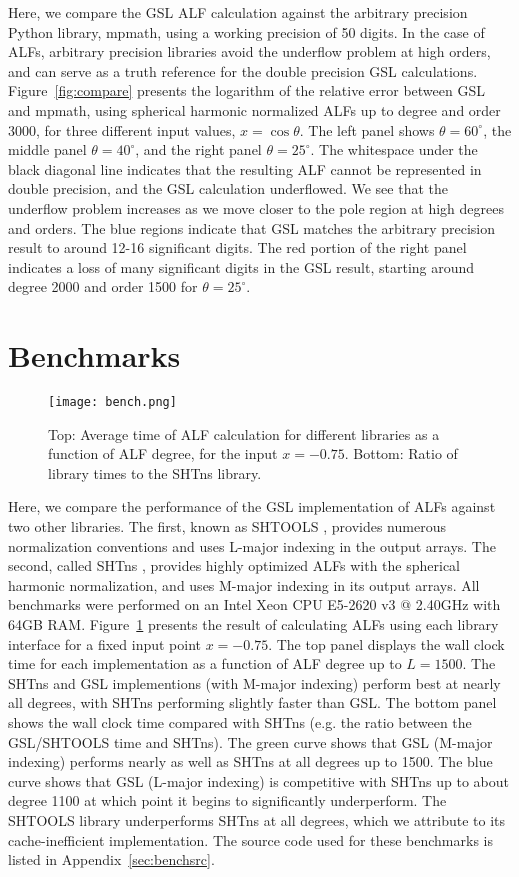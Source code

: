 \documentclass[12pt]{article}
\begin{document}
Here, we compare the GSL ALF calculation against the
arbitrary precision Python library, mpmath, using a working
precision of 50 digits. In the case of ALFs, arbitrary precision
libraries avoid the underflow problem at high orders, and can
serve as a truth reference for the double precision GSL calculations.
Figure~\ref{fig:compare} presents the logarithm of the relative error
between GSL and mpmath, using spherical harmonic normalized ALFs up to
degree and order 3000, for three different input values, $x = \cos{\theta}$.
The left panel shows $\theta = 60^{\circ}$, the middle panel
$\theta = 40^{\circ}$, and the right panel $\theta = 25^{\circ}$. The
whitespace under the black diagonal line indicates that the resulting
ALF cannot be represented in double precision, and the GSL calculation
underflowed. We see that the underflow problem increases as we move
closer to the pole region at high degrees and orders. The blue regions
indicate that GSL matches the arbitrary precision result to around 12-16
significant digits. The red portion of the right panel indicates a
loss of many significant digits in the GSL result, starting around
degree 2000 and order 1500 for $\theta = 25^{\circ}$.

\section{Benchmarks}

\begin{figure}[ht]
\texttt{[image: bench.png]}
\caption{Top: Average time of ALF calculation for different libraries as a function of ALF
degree, for the input $x = -0.75$. Bottom: Ratio of library times to the SHTns library.}
\label{fig:bench}
\end{figure}

Here, we compare the performance of the GSL implementation of ALFs
against two other libraries. The first, known as SHTOOLS
\citep{wieczorek2018}, provides numerous normalization conventions
and uses L-major indexing in the output arrays. The second,
called SHTns \citep{schaeffer2013}, provides highly optimized ALFs
with the spherical harmonic normalization, and uses M-major indexing
in its output arrays. All benchmarks were performed on an Intel Xeon
CPU E5-2620 v3 @ 2.40GHz with 64GB RAM. Figure~\ref{fig:bench} presents the result of
calculating ALFs using each library interface for a fixed input point
$x = -0.75$. The top panel displays the wall clock time for each
implementation as a function of ALF degree up to $L = 1500$. The
SHTns and GSL implementions (with M-major indexing) perform best at
nearly all degrees, with SHTns performing slightly faster than GSL.
The bottom panel shows the wall clock time compared with SHTns (e.g.
the ratio between the GSL/SHTOOLS time and SHTns). The green
curve shows that GSL (M-major indexing) performs nearly as well as SHTns
at all degrees up to 1500. The blue curve shows that GSL (L-major indexing)
is competitive with SHTns up to about degree 1100 at which point it
begins to significantly underperform. The SHTOOLS library underperforms
SHTns at all degrees, which we attribute to its cache-inefficient implementation.
The source code used for these benchmarks is listed in Appendix~\ref{sec:benchsrc}.
\end{document}
